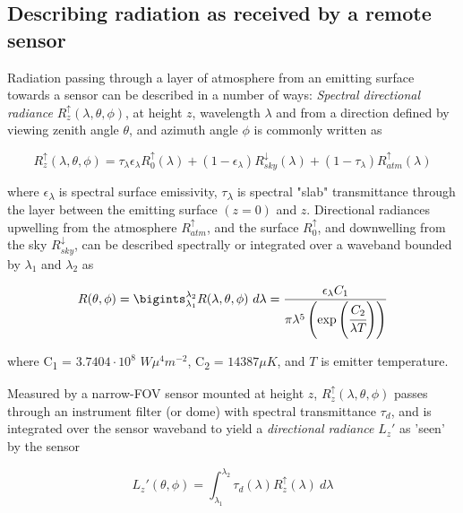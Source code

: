 \subsection{Describing radiation as received by a remote sensor}

Radiation passing through a layer of atmosphere from an emitting surface towards a sensor can be described in a number of ways: \textit{Spectral directional radiance} $R^\uparrow_z (\lambda, \theta, \phi)$, at height $ z $, wavelength $\lambda$ and from a direction defined by viewing zenith angle \(\theta\), and azimuth angle \(\phi\) is commonly written as

\begin{equation}
R^\uparrow_z (\lambda, \theta, \phi) = \tau_\lambda \epsilon_\lambda R^\uparrow_0(\lambda) + (1-\epsilon_\lambda) R^\downarrow_{sky} (\lambda) + (1-\tau_\lambda) R^\uparrow_{atm}(\lambda)
\end{equation}

\noindent where \(\epsilon\)\textsubscript{\( \lambda \)} is spectral surface emissivity, \(\tau\)\textsubscript{\( \lambda \)} is spectral "slab" transmittance through the layer between the emitting surface $( z  = 0) $ and $ z $. Directional radiances upwelling from the atmosphere $R^\uparrow_{atm}$, and the surface $R^\uparrow_0$, and downwelling from the sky $R^\downarrow_{sky}$, can be described spectrally or integrated over a waveband bounded by \(\lambda_1\) and \(\lambda_2\) as

\begin{equation}
R(\theta, \phi) = \bigints_{\lambda_1}^{\lambda_2} R(\lambda,\theta, \phi) ~ d\lambda =\displaystyle\frac{\epsilon_\lambda C_1}{\pi \lambda^5 \left( \exp\left(\cfrac{C_2}{\lambda T}\right)\right)}
\end{equation}

\noindent where C\textsubscript{1} = $ 3.7404 \cdot 10^8 $ $ W\mu^4 m^{-2} $, C\textsubscript{2} = $ 14387 \mu K $, and $T$ is emitter temperature.

Measured by a narrow-FOV sensor mounted at height $ z $, $R^\uparrow_z (\lambda, \theta, \phi)$ passes through an instrument filter (or dome) with spectral transmittance \(\tau_d\), and is integrated over the sensor waveband to yield a \textit{directional radiance} $L_z'$ as 'seen' by the sensor

\begin{equation}
L_z' (\theta, \phi) = \int_{\lambda_1}^{\lambda_2} \tau_d(\lambda) R^\uparrow_z(\lambda) ~ d\lambda
\end{equation}

